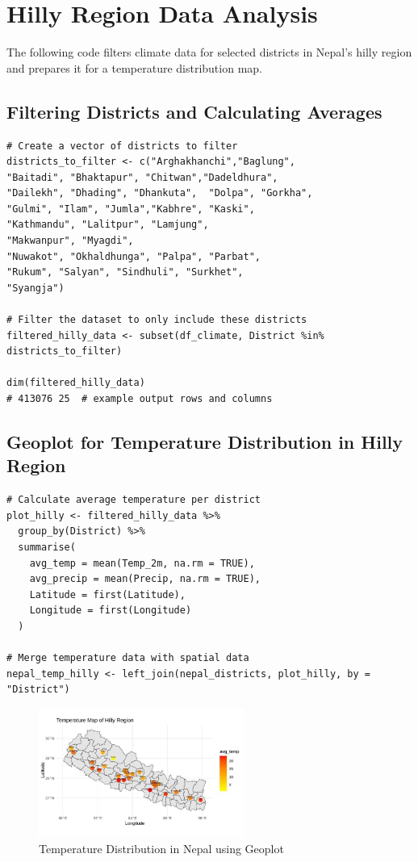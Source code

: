 \section{Hilly Region Data Analysis}

The following code filters climate data for selected districts in Nepal’s hilly region and prepares it for a temperature distribution map.

\subsection*{Filtering Districts and Calculating Averages}

\begin{verbatim}
# Create a vector of districts to filter
districts_to_filter <- c("Arghakhanchi","Baglung",
"Baitadi", "Bhaktapur", "Chitwan","Dadeldhura",
"Dailekh", "Dhading", "Dhankuta",  "Dolpa", "Gorkha", 
"Gulmi", "Ilam", "Jumla","Kabhre", "Kaski", 
"Kathmandu", "Lalitpur", "Lamjung", 
"Makwanpur", "Myagdi", 
"Nuwakot", "Okhaldhunga", "Palpa", "Parbat", 
"Rukum", "Salyan", "Sindhuli", "Surkhet",
"Syangja")

# Filter the dataset to only include these districts
filtered_hilly_data <- subset(df_climate, District %in% districts_to_filter)

dim(filtered_hilly_data)
# 413076 25  # example output rows and columns
\end{verbatim}

\subsection*{Geoplot for Temperature Distribution in Hilly Region}

\begin{verbatim}
# Calculate average temperature per district
plot_hilly <- filtered_hilly_data %>%
  group_by(District) %>%
  summarise(
    avg_temp = mean(Temp_2m, na.rm = TRUE),
    avg_precip = mean(Precip, na.rm = TRUE),
    Latitude = first(Latitude),
    Longitude = first(Longitude)
  )

# Merge temperature data with spatial data
nepal_temp_hilly <- left_join(nepal_districts, plot_hilly, by = "District")
\end{verbatim}

\begin{figure}[h]
\centering
\includegraphics[width=0.6\textwidth]{figures/hilly_map.jpg}
\caption{Temperature Distribution in Nepal using Geoplot
}
\end{figure}

